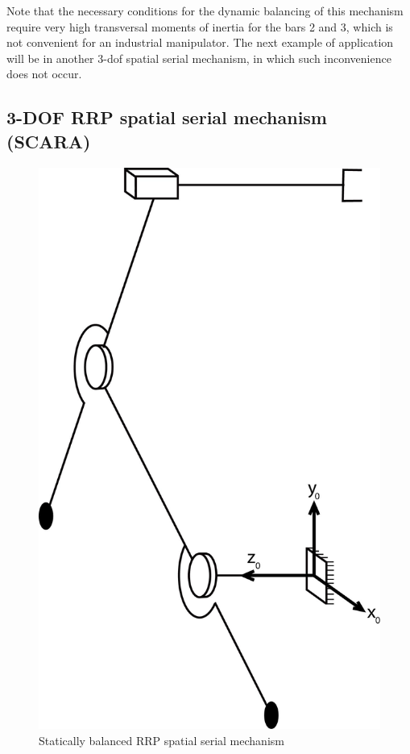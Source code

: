 \documentclass[a4paper,11pt,brazil,fleqn]{article}
\begin{document}
Note that the necessary conditions for the dynamic balancing of this mechanism require very high transversal moments of inertia for the bars 2 and 3, which is not convenient for an industrial manipulator. The next example of application will be in another 3-dof spatial serial mechanism, in which such inconvenience does not occur.

\subsection{3-DOF RRP spatial serial mechanism (SCARA)} \label{S03-2}

\begin{figure}[H]
	\centering
	\includegraphics[scale=0.11]{RRP.jpg}  
	\caption{Statically balanced RRP spatial serial mechanism}
	\label{fig:RRP}
\end{figure}
\end{document}
